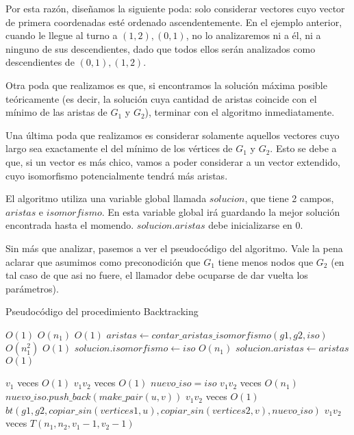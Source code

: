 Por esta razón, diseñamos la siguiente poda: solo considerar vectores cuyo vector de primera coordenadas esté ordenado ascendentemente. En el ejemplo anterior, cuando le llegue al turno a ${(1,2), (0,1)}$, no lo analizaremos ni a él, ni a ninguno de sus descendientes, dado que todos ellos serán analizados como descendientes de ${(0,1), (1,2)}$.

Otra poda que realizamos es que, si encontramos la solución máxima posible teóricamente (es decir, la solución cuya cantidad de aristas coincide con el mínimo de las aristas de $G_1$ y $G_2$), terminar con el algoritmo inmediatamente.

Una última poda que realizamos es considerar solamente aquellos vectores cuyo largo sea exactamente el del mínimo de los vértices de $G_1$ y $G_2$. Esto se debe a que, si un vector es más chico, vamos a poder considerar a un vector extendido, cuyo isomorfismo potencialmente tendrá más aristas.

El algoritmo utiliza una variable global llamada $solucion$, que tiene 2 campos, $aristas$ e $isomorfismo$. En esta variable global irá guardando la mejor solución encontrada hasta el momendo. $solucion.aristas$ debe inicializarse en 0.

Sin más que analizar, pasemos a ver el pseudocódigo del algoritmo. Vale la pena aclarar que asumimos como preconodición que $G_1$ tiene menos nodos que $G_2$ (en tal caso de que asi no fuere, el llamador debe ocuparse de dar vuelta los parámetros).


\begin{algorithm}[H]
  \begin{algorithmic}[1]
  \caption{Pseudocódigo del procedimiento Backtracking}
  \label{algo:2-1}
        \Comment $O(1)$ 
        \State \Return
      \EndIf
        \Comment $O(n_1)$ 
        \State \Return
      \EndIf
        \Comment $O(1)$ 
        \State $aristas \gets contar\_aristas\_isomorfismo(g1, g2, iso)$
        \Comment $O(n_1^2)$ 
          \Comment $O(1)$ 
          \State $solucion.isomorfismo \gets iso$
          \Comment $O(n_1)$ 
          \State $solucion.aristas \gets aristas$
          \Comment $O(1)$ 
        \EndIf
        \State \Return
      \EndIf
      
        \Comment $v_1$ veces $O(1)$ 
          \Comment $v_1 v_2$ veces $O(1)$ 
          \State $nuevo\_iso = iso$
          \Comment $v_1 v_2$ veces $O(n_1)$ 
          \State $nuevo\_iso.push\_back(make\_pair(u,v))$
          \Comment $v_1 v_2$ veces $O(1)$ 
          \State $bt(g1, g2, copiar\_sin(vertices1, u), copiar\_sin(vertices2, v), nuevo\_iso)$
          \Comment $v_1 v_2$ veces $T(n_1, n_2, v_1 - 1, v_2 - 1)$
        \EndFor
      \EndFor
		\EndProcedure
	\end{algorithmic}
\end{algorithm}



